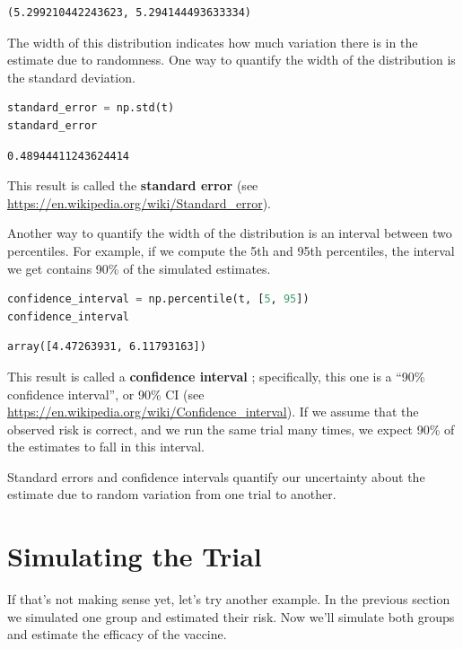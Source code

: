 \begin{lstlisting}[style=output]
(5.299210442243623, 5.294144493633334)
\end{lstlisting}

The width of this distribution indicates how much variation there is in
the estimate due to randomness. One way to quantify the width of the
distribution is the standard deviation.

\begin{lstlisting}[language=Python,style=source]
standard_error = np.std(t)
standard_error
\end{lstlisting}

\begin{lstlisting}[style=output]
0.48944411243624414
\end{lstlisting}

This result is called the \textbf{standard error} (see
\url{https://en.wikipedia.org/wiki/Standard_error}).

Another way to quantify the width of the distribution is an interval
between two percentiles. For example, if we compute the 5th and 95th
percentiles, the interval we get contains 90\% of the simulated
estimates.

\begin{lstlisting}[language=Python,style=source]
confidence_interval = np.percentile(t, [5, 95])
confidence_interval
\end{lstlisting}

\begin{lstlisting}[style=output]
array([4.47263931, 6.11793163])
\end{lstlisting}

This result is called a \textbf{confidence interval} ; specifically,
this one is a ``90\% confidence interval'', or 90\% CI (see
\url{https://en.wikipedia.org/wiki/Confidence_interval}). If we assume
that the observed risk is correct, and we run the same trial many times,
we expect 90\% of the estimates to fall in this interval.

Standard errors and confidence intervals quantify our uncertainty about
the estimate due to random variation from one trial to another.

\hypertarget{simulating-the-trial}{%
\section{Simulating the Trial}\label{simulating-the-trial}}

If that's not making sense yet, let's try another example. In the
previous section we simulated one group and estimated their risk. Now
we'll simulate both groups and estimate the efficacy of the vaccine.

